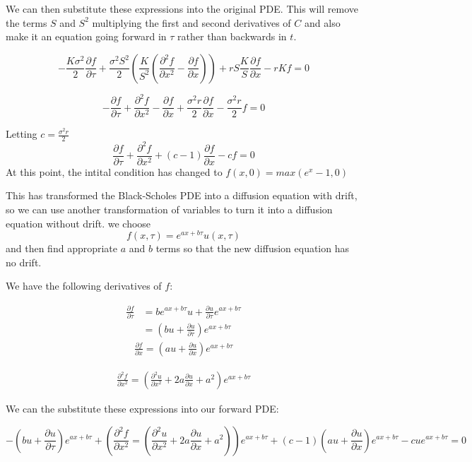 \documentclass[11pt]{article}
\begin{document}
We can then substitute these expressions into the original PDE. This will remove the terms $S$ and $S^2$ multiplying the first and second derivatives of $C$ and also make it an equation going forward in $\tau$ rather than backwards in $t$.

\[-\frac{K\sigma^2}{2} \frac{\partial f}{\partial \tau} + \frac{\sigma^2 S^2}{2} \left(\frac{K}{S^2}\left(\frac{\partial^2 f}{\partial x^2} -\frac{\partial f}{\partial x} \right) \right) + rS\frac{K}{S}\frac{\partial f}{\partial x} - rKf = 0\]

\[
-\frac{\partial f}{\partial \tau} + \frac{ \partial^2 f}{\partial x^2} - \frac{\partial f}{\partial x} + \frac{\sigma^2 r}{2}\frac{\partial f}{\partial x} -\frac{\sigma^2 r}{2} f = 0
\]

\hspace{5cm}Letting $c = \frac{\sigma^2 r}{2}$
\[
\frac{\partial f}{\partial \tau} + \frac{ \partial^2 f}{\partial x^2} + (c-1) \frac{\partial f}{\partial x} - cf = 0
\] At this point, the intital condition has changed to $f(x, 0) = max(e^x -1 , 0)$

This has transformed the Black-Scholes PDE into a diffusion equation with drift, so we can use another transformation of variables to turn it into a diffusion equation without drift. we choose \[f (x, \tau) = e^{ax+b\tau} u(x,\tau)\]  and then find appropriate $a$ and $b$ terms so that the new diffusion equation has no drift.

We have the following derivatives of $f$:

\begin{align*}
    \frac{\partial f}{\partial \tau} &= be^{ax+b\tau} u + \frac{\partial u}{\partial \tau} e^{ax+b\tau} \\
    &= \left(bu+\frac{\partial u}{\partial \tau} \right) e^{ax+b\tau}
\end{align*}
\begin{align*}
    \frac{\partial f}{\partial x} = \left(au + \frac{\partial u}{\partial x} \right) e^{ax+b\tau}
\end{align*}

\begin{align*}
    \frac{\partial^2 f}{\partial x^2} = \left( \frac{\partial^2 u}{\partial x^2} + 2a\frac{\partial u}{\partial x} + a^2 \right) e^{ax+b\tau}
\end{align*}

We can the substitute these expressions into our forward PDE:

\[
-\left(bu + \frac{\partial u}{\partial \tau} \right)e^{ax+b\tau} + \left(\frac{\partial^2 f}{\partial x^2} = \left( \frac{\partial^2 u}{\partial x^2} + 2a\frac{\partial u}{\partial x} + a^2 \right) \right) e^{ax+b\tau} + (c-1)\left (au + \frac{\partial u}{\partial x} \right) e^{ax+b\tau} - cue^{ax+b\tau} = 0
\]
\end{document}
